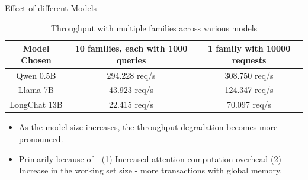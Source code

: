 \documentclass[Serif, 10pt, brown]{beamer}
\theoremstyle{example}
\theoremstyle{plain}
\begin{document}
\begin{frame}{Effect of different Models}
    
\begin{table}[h!]
\scriptsize
\centering
\begin{tabular}{|c||c|c|}
\hline
\textbf{Model Chosen} & \textbf{10 families, each with 1000 queries} & \textbf{1 family with 10000 requests} \\
\hline
\hline
Qwen 0.5B & 294.228 req/s &  308.750 req/s\\
\hline
Llama 7B & 43.923 req/s&  124.347 req/s\\
\hline
LongChat 13B & 22.415 req/s& 70.097 req/s\\
\hline
\end{tabular}
\caption{Throughput with multiple families across various models}
\end{table}

\begin{itemize}
        \item As the model size increases, the throughput degradation becomes more pronounced. \pause
        \item Primarily because of - (1) Increased attention computation overhead (2) Increase in the working set size - more transactions with global memory.
    \end{itemize}
\end{frame}
\end{document}
